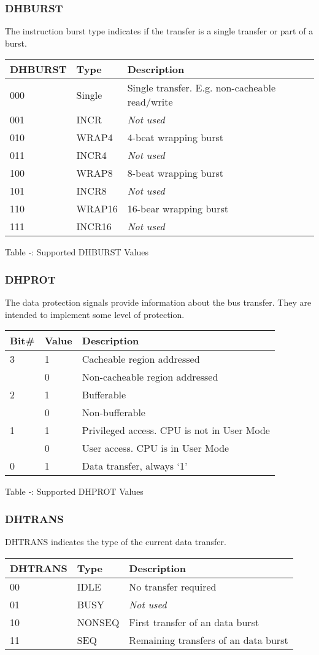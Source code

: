 \subsubsection{DHBURST}\label{dhburst}

The instruction burst type indicates if the transfer is a single
transfer or part of a burst.

\begin{longtable}[]{@{}lll@{}}
\toprule
DHBURST & Type & Description\tabularnewline
\midrule
\endhead
000 & Single & Single transfer. E.g. non-cacheable
read/write\tabularnewline
001 & INCR & \emph{Not used}\tabularnewline
010 & WRAP4 & 4-beat wrapping burst\tabularnewline
011 & INCR4 & \emph{Not used}\tabularnewline
100 & WRAP8 & 8-beat wrapping burst\tabularnewline
101 & INCR8 & \emph{Not used}\tabularnewline
110 & WRAP16 & 16-bear wrapping burst\tabularnewline
111 & INCR16 & \emph{Not used}\tabularnewline
\bottomrule
\end{longtable}

\protect\hypertarget{_Toc326677785}{}{}Table ‑: Supported DHBURST Values

\subsubsection{DHPROT}\label{dhprot}

The data protection signals provide information about the bus transfer.
They are intended to implement some level of protection.

\begin{longtable}[]{@{}lll@{}}
\toprule
Bit\# & Value & Description\tabularnewline
\midrule
\endhead
3 & 1 & Cacheable region addressed\tabularnewline
& 0 & Non-cacheable region addressed\tabularnewline
2 & 1 & Bufferable\tabularnewline
& 0 & Non-bufferable\tabularnewline
1 & 1 & Privileged access. CPU is not in User Mode\tabularnewline
& 0 & User access. CPU is in User Mode\tabularnewline
0 & 1 & Data transfer, always `1'\tabularnewline
\bottomrule
\end{longtable}

Table ‑: Supported DHPROT Values

\subsubsection{DHTRANS}\label{dhtrans}

DHTRANS indicates the type of the current data transfer.

\begin{longtable}[]{@{}lll@{}}
\toprule
DHTRANS & Type & Description\tabularnewline
\midrule
\endhead
00 & IDLE & No transfer required\tabularnewline
01 & BUSY & \emph{Not used}\tabularnewline
10 & NONSEQ & First transfer of an data burst\tabularnewline
11 & SEQ & Remaining transfers of an data burst\tabularnewline
\bottomrule
\end{longtable}

